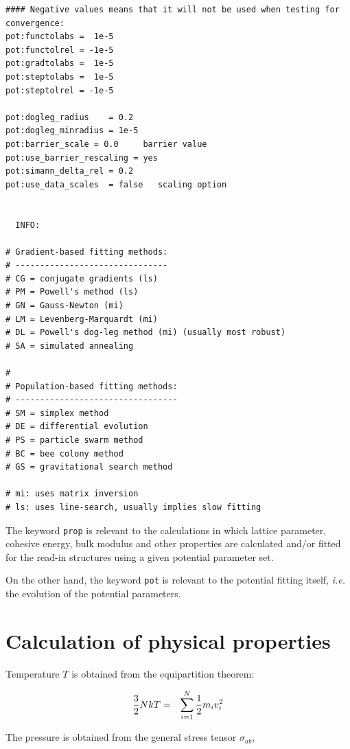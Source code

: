 \documentclass[a4paper,12pt,pdftex,onecolumn]{article}
\newcommand{\ie}{\emph{i.e.}\xspace}
\begin{document}
\begin{Verbatim}[fontsize=\relsize{-1},frame=single]
#### Negative values means that it will not be used when testing for convergence:
pot:functolabs =  1e-5
pot:functolrel = -1e-5
pot:gradtolabs =  1e-5
pot:steptolabs =  1e-5
pot:steptolrel = -1e-5

pot:dogleg_radius    = 0.2
pot:dogleg_minradius = 1e-5
pot:barrier_scale = 0.0     barrier value
pot:use_barrier_rescaling = yes
pot:simann_delta_rel = 0.2
pot:use_data_scales  = false   scaling option


  INFO:

# Gradient-based fitting methods:
# -------------------------------
# CG = conjugate gradients (ls)
# PM = Powell's method (ls)
# GN = Gauss-Newton (mi)
# LM = Levenberg-Marquardt (mi)
# DL = Powell's dog-leg method (mi) (usually most robust)
# SA = simulated annealing

#
# Population-based fitting methods:
# ---------------------------------
# SM = simplex method
# DE = differential evolution
# PS = particle swarm method
# BC = bee colony method
# GS = gravitational search method

# mi: uses matrix inversion
# ls: uses line-search, usually implies slow fitting

\end{Verbatim}



The keyword \verb+prop+ is relevant to the calculations in which
lattice parameter, cohesive energy, bulk modulus and other
properties are calculated and/or fitted for the read-in structures
using a given potential parameter set.

On the other hand, the keyword \verb+pot+ is relevant to the
potential fitting itself, \ie the evolution of the potential
parameters.









\section{Calculation of physical properties}

Temperature $T$ is obtained from the equipartition theorem:

\begin{eqnarray}
{3 \over 2} N kT &=& \sum_{i=1}^N {1\over 2} m_i v_i^2
\end{eqnarray}

The pressure is obtained from the general stress tensor $\sigma_{ab}$,
\end{document}
